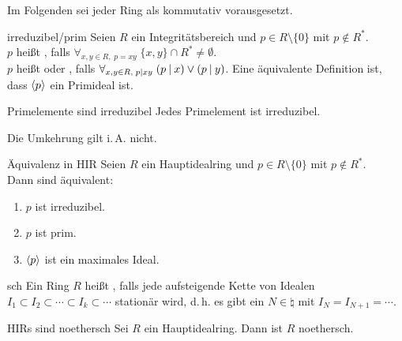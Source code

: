 \begin{Bem}
    Im Folgenden sei jeder Ring als kommutativ vorausgesetzt.
\end{Bem}

\begin{Def}{irreduzibel/prim}
    Seien $R$ ein Integritätsbereich und $p \in R \setminus \{0\}$ mit
    $p \notin R^\ast$.\\
    $p$ heißt , falls
    $\forall_{x, y \in R,\; p = xy}\; \{x, y\} \cap R^\ast \not= \emptyset$.\\
    $p$ heißt  oder , falls
    $\forall_{x, y \in R,\; p \mathbin{|} xy}\; (p \mathbin{|} x) \lor (p \mathbin{|} y)$.
    Eine äquivalente Definition ist, dass $\left\langle p\right\rangle$ ein Primideal ist.
\end{Def}

\begin{Lemma}{Primelemente sind irreduzibel}
    Jedes Primelement ist irreduzibel.
\end{Lemma}

\begin{Bem}
    Die Umkehrung gilt i.\,A. nicht.
\end{Bem}

\begin{Prop}{Äquivalenz in HIR}
    Seien $R$ ein Hauptidealring und $p \in R \setminus \{0\}$ mit
    $p \notin R^\ast$.\\
    Dann sind äquivalent:
    \begin{enumerate}[label=(\alph*)]
        \item
        $p$ ist irreduzibel.
        
        \item
        $p$ ist prim.
        
        \item
        $\left\langle p\right\rangle$ ist ein maximales Ideal.
    \end{enumerate}
\end{Prop}

\linie

\begin{Def}{sch}
    Ein Ring $R$ heißt , falls
    jede aufsteigende Kette von Idealen
    $I_1 \subset I_2 \subset \dotsb \subset I_k \subset \dotsb$
    stationär wird, d.\,h. es gibt ein $N \in \natural$ mit
    $I_N = I_{N+1} = \dotsb$.
\end{Def}

\begin{Lemma}{HIRs sind noethersch}
    Sei $R$ ein Hauptidealring.
    Dann ist $R$ noethersch.
\end{Lemma}

